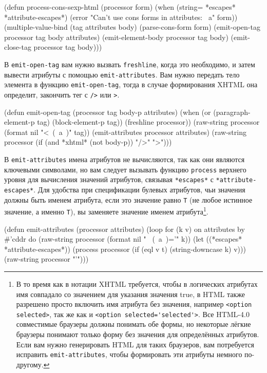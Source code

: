 \begin{myverb}
(defun process-cons-sexp-html (processor form)
  (when (string= *escapes* *attribute-escapes*)
    (error "Can't use cons forms in attributes: ~a" form))
  (multiple-value-bind (tag attributes body) (parse-cons-form form)
    (emit-open-tag     processor tag body attributes)
    (emit-element-body processor tag body)
    (emit-close-tag    processor tag body)))
\end{myverb}

В \lstinline{emit-open-tag} вам нужно вызвать \lstinline{freshline}, когда это необходимо, и затем
вывести атрибуты с помощью \lstinline{emit-attributes}. Вам нужно передать тело элемента в
функцию \lstinline{emit-open-tag}, тогда в случае формирования XHTML она определит, закончить
тег с \lstinline{/>} или \lstinline{>}.

\begin{myverb}
(defun emit-open-tag (processor tag body-p attributes)
  (when (or (paragraph-element-p tag) (block-element-p tag))
    (freshline processor))
  (raw-string processor (format nil "<~(~a~)" tag))
  (emit-attributes processor attributes)
  (raw-string processor (if (and *xhtml* (not body-p)) "/>" ">")))
\end{myverb}

В \lstinline{emit-attributes} имена атрибутов не вычисляются, так как они являются
ключевыми символами, но вам следует вызывать функцию \lstinline{process} верхнего уровня
для вычисления значений атрибутов, связывая \lstinline{*escapes*} с
\lstinline{*attribute-escapes*}. Для удобства при спецификации булевых атрибутов, чьи
значения должны быть именем атрибута, если это значение равно \lstinline{Т} (не любое
истинное значение, а именно \lstinline{Т}), вы заменяете значение именем
атрибута\footnote{В то время как в нотации XHTML требуется, чтобы в логических атрибутах
  имя совпадало со значением для указания значения true, в HTML также разрешено просто
  включить имя атрибута без значения, например \lstinline{<option selected>}, так же как и
  \lstinline{<option selected='selected'>}. Все HTML-4.0 совместимые браузеры должны
  понимать обе формы, но некоторые лёгкие браузеры понимают только форму без значения для
  определённых атрибутов. Если вам нужно генерировать HTML для таких браузеров, вам
  потребуется исправить \lstinline{emit-attributes}, чтобы формировать эти атрибуты
  немного по-другому.}.

\begin{myverb}
(defun emit-attributes (processor attributes)
  (loop for (k v) on attributes by #'cddr do
       (raw-string processor (format nil " ~(~a~)='" k))
       (let ((*escapes* *attribute-escapes*))
         (process processor (if (eql v t) (string-downcase k) v)))
       (raw-string processor "'")))
\end{myverb}

